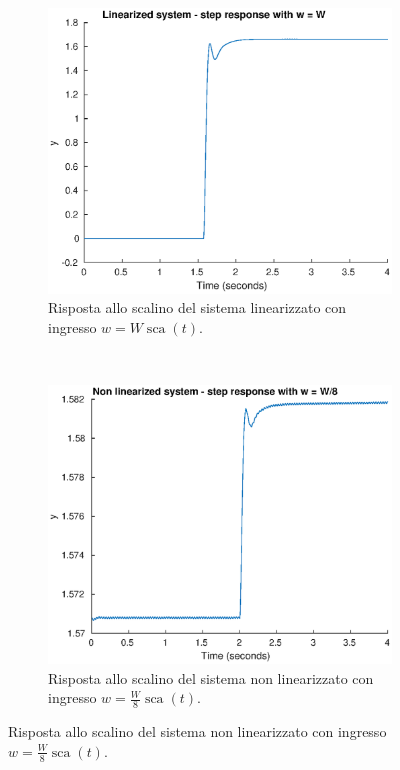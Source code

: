 \documentclass[a4paper]{article}
\DeclareMathOperator*{\sca}{\textrm{sca}}
\begin{document}
\begin{figure}[h!]
    \centering
\begin{subfigure}[t]{0.3\textwidth}
    \centering
    \includegraphics[width=\textwidth]{step_lin}
    \caption{Risposta allo scalino del sistema linearizzato con ingresso $w = W \sca (t)$.}
    \label{fig:step_sim_lin}
\end{subfigure}
~
\begin{subfigure}[t]{0.3\textwidth}
    \centering
    \includegraphics[width=\textwidth]{step_nonlin_short}
    \caption{Risposta allo scalino del sistema non linearizzato con ingresso $w = \frac{W}{8} \sca (t)$.}

\end{subfigure}
\end{figure}
\end{document}
